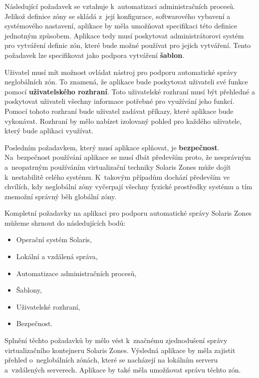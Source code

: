 Následující požadavek se vztahuje k~automatizaci administračních procesů. Jelikož definice zóny se skládá z~její
konfigurace, softwarového vybavení a systémového nastavení, aplikace by měla umožňovat specifikaci této definice 
jednotným způsobem. Aplikace tedy musí poskytovat administrátorovi systém pro vytváření definic zón, které bude možné
používat pro jejich vytváření. Tento požadavek lze specifikovat jako podpora vytváření \textbf{šablon}.

Uživatel musí mít možnost ovládat nástroj pro podporu automatické správy neglobálních zón. To znamená, že aplikace bude
poskytovat uživateli své funkce pomocí \textbf{uživatelského rozhraní}. Toto uživatelské rozhraní musí být přehledné a poskytovat
uživateli všechny informace potřebné pro využívání jeho funkcí. Pomocí tohoto rozhraní bude uživatel zadávat příkazy, které
aplikace bude vykonávat. Rozhraní by mělo nabízet izolovaný pohled pro každého uživatele, který bude aplikaci využívat.

Posledním požadavkem, který musí aplikace splňovat, je \textbf{bezpečnost}. Na~bezpečnost používání aplikace se musí dbát především
proto, že nesprávným a~neopatrným používáním virtualizační techniky Solaris Zones může dojít k~nestabilitě celého systému.
K~takovým případům dochází především ve chvílích, kdy neglobální zóny vyčerpají všechny fyzické prostředky systému a tím
znemožní správný běh globální zóny.

Kompletní požadavky na aplikaci pro podporu automatické správy Solaris Zones můžeme shrnout do následujících bodů:
\begin{itemize}
 \item Operační systém Solaris,
 \item Lokální a vzdálená správa,
 \item Automatizace administračních procesů,
 \item Šablony,
 \item Uživatelské rozhraní,
 \item Bezpečnost.
\end{itemize}
Splnění těchto požadavků by mělo vést k~značnému zjednodušení správy virtualizačního kontejneru Solaris Zones. Výsledná
aplikace by měla zajistit přehled o~neglobálních zónách, které se nacházejí na lokálním serveru a~vzdálených serverech. Aplikace
by také měla umožňovat správu těchto zón. 
